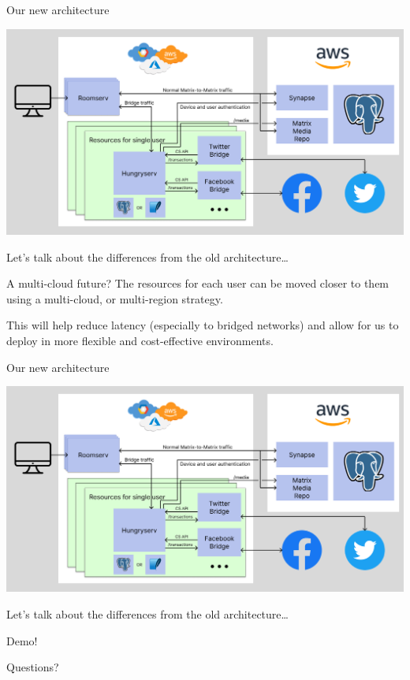 \documentclass{beeper}
\begin{document}
\begin{frame}{Our new architecture}
    \centerline{\includegraphics[width=1.15\textwidth]{images/new-architecture}}

    Let's talk about the differences from the old architecture\ldots
\end{frame}

\begin{frame}{A multi-cloud future?}
    The resources for each user can be moved closer to them using a multi-cloud,
    or multi-region strategy.

    This will help reduce latency (especially to bridged networks) and allow for
    us to deploy in more flexible and cost-effective environments.
\end{frame}

\begin{frame}{Our new architecture}
    \centerline{\includegraphics[width=1.15\textwidth]{images/new-architecture}}

    Let's talk about the differences from the old architecture\ldots
\end{frame}

\begingroup
\def\insertframenumber{\relax}
\begin{frame}[standout]
    \Large
    Demo!
\end{frame}

\begin{frame}[standout]
    \Large
    Questions?
\end{frame}
\endgroup
\end{document}
